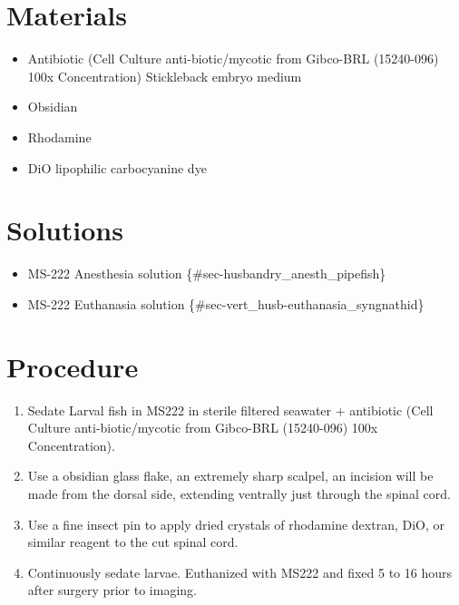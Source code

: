 \documentclass[
  letterpaper,
  DIV=11,
  numbers=noendperiod]{scrreprt}
\providecommand{\tightlist}{%
  \setlength{\itemsep}{0pt}\setlength{\parskip}{0pt}}\usepackage{longtable,booktabs,array}
\begin{document}
\hypertarget{materials-56}{%
\section{Materials}\label{materials-56}}

\begin{itemize}
\tightlist
\item
  Antibiotic (Cell Culture anti-biotic/mycotic from Gibco-BRL
  (15240-096) 100x Concentration) Stickleback embryo medium
\item
  Obsidian
\item
  Rhodamine
\item
  DiO lipophilic carbocyanine dye
\end{itemize}

\hypertarget{solutions-53}{%
\section{Solutions}\label{solutions-53}}

\begin{itemize}
\tightlist
\item
  MS-222 Anesthesia solution \{\#sec-husbandry\_anesth\_pipefish\}
\item
  MS-222 Euthanasia solution \{\#sec-vert\_husb-euthanasia\_syngnathid\}
\end{itemize}

\hypertarget{procedure-57}{%
\section{Procedure}\label{procedure-57}}

\begin{enumerate}
\def\labelenumi{\arabic{enumi}.}
\tightlist
\item
  Sedate Larval fish in MS222 in sterile filtered seawater + antibiotic
  (Cell Culture anti-biotic/mycotic from Gibco-BRL (15240-096) 100x
  Concentration).
\item
  Use a obsidian glass flake, an extremely sharp scalpel, an incision
  will be made from the dorsal side, extending ventrally just through
  the spinal cord.
\item
  Use a fine insect pin to apply dried crystals of rhodamine dextran,
  DiO, or similar reagent to the cut spinal cord.
\item
  Continuously sedate larvae. Euthanized with MS222 and fixed 5 to 16
  hours after surgery prior to imaging.
\end{enumerate}
\end{document}
